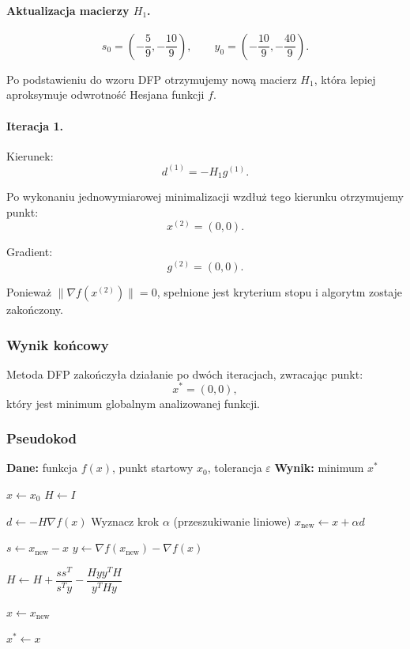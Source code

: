 \documentclass[10pt,a4paper]{article}
\begin{document}
\paragraph{Aktualizacja macierzy $H_1$.}

\[
s_0 =
\left(-\frac{5}{9}, -\frac{10}{9}\right), \qquad
y_0 =
\left(-\frac{10}{9}, -\frac{40}{9}\right).
\]

Po podstawieniu do wzoru DFP otrzymujemy nową macierz $H_1$, która
lepiej aproksymuje odwrotność Hesjana funkcji $f$.



\paragraph{Iteracja 1.}

Kierunek:
\[
d^{(1)} = -H_1 g^{(1)}.
\]

Po wykonaniu jednowymiarowej minimalizacji wzdłuż tego kierunku
otrzymujemy punkt:
\[
x^{(2)} = (0,0).
\]

Gradient:
\[
g^{(2)} = (0,0).
\]

Ponieważ $\|\nabla f(x^{(2)})\| = 0$, spełnione jest kryterium stopu
i algorytm zostaje zakończony.



\subsubsection{Wynik końcowy}

Metoda DFP zakończyła działanie po dwóch iteracjach,
zwracając punkt:
\[
x^\ast = (0,0),
\]
który jest minimum globalnym analizowanej funkcji.


\subsubsection{Pseudokod}

\begin{algorithm}[H]
\caption{Metoda BFGS (quasi-Newtona)}
\begin{algorithmic}[1]
\STATE \textbf{Dane:} funkcja $f(x)$, punkt startowy $x_0$, tolerancja $\varepsilon$
\STATE \textbf{Wynik:} minimum $x^\ast$

\STATE $x \leftarrow x_0$
\STATE $H \leftarrow I$ 

    \STATE $d \leftarrow - H \nabla f(x)$
    \STATE Wyznacz krok $\alpha$ (przeszukiwanie liniowe)
    \STATE $x_{\text{new}} \leftarrow x + \alpha d$

    \STATE $s \leftarrow x_{\text{new}} - x$
    \STATE $y \leftarrow \nabla f(x_{\text{new}}) - \nabla f(x)$

    \STATE $H \leftarrow H + \dfrac{s s^{T}}{s^{T} y}
    - \dfrac{H y y^{T} H}{y^{T} H y}$

    \STATE $x \leftarrow x_{\text{new}}$
\ENDWHILE

\STATE $x^\ast \leftarrow x$
\end{algorithmic}
\end{algorithm}
\end{document}

